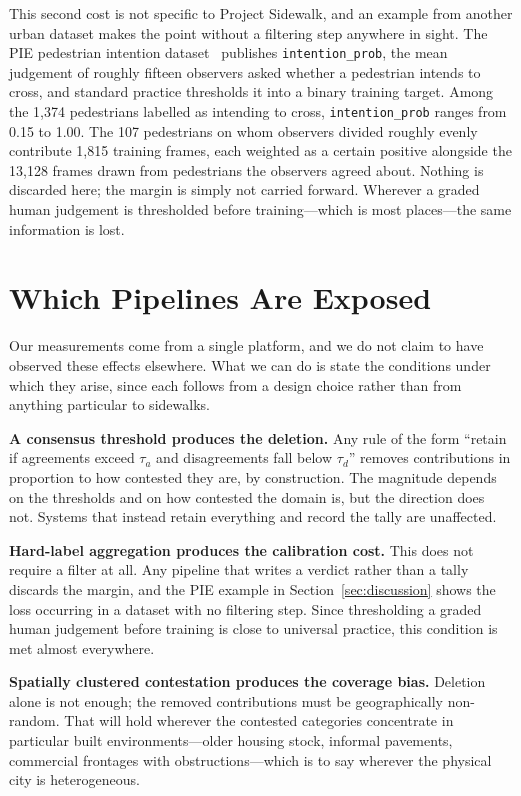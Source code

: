 \documentclass[sigconf]{acmart}
\begin{document}
This second cost is not specific to Project Sidewalk, and an example from
another urban dataset makes the point without a filtering step anywhere in
sight. The PIE pedestrian intention dataset~\cite{rasouli2019pie} publishes
\texttt{intention\_prob}, the mean judgement of roughly fifteen observers asked
whether a pedestrian intends to cross, and standard practice thresholds it into
a binary training target. Among the 1{,}374 pedestrians labelled as intending
to cross, \texttt{intention\_prob} ranges from 0.15 to 1.00. The 107
pedestrians on whom observers divided roughly evenly contribute 1{,}815
training frames, each weighted as a certain positive alongside the 13{,}128
frames drawn from pedestrians the observers agreed about. Nothing is discarded
here; the margin is simply not carried forward. Wherever a graded human
judgement is thresholded before training---which is most places---the same
information is lost.

\section{Which Pipelines Are Exposed}
\label{sec:susceptible}

Our measurements come from a single platform, and we do not claim to have
observed these effects elsewhere. What we can do is state the conditions under
which they arise, since each follows from a design choice rather than from
anything particular to sidewalks.

\textbf{A consensus threshold produces the deletion.} Any rule of the form
``retain if agreements exceed $\tau_a$ and disagreements fall below $\tau_d$''
removes contributions in proportion to how contested they are, by construction.
The magnitude depends on the thresholds and on how contested the domain is, but
the direction does not. Systems that instead retain everything and record the
tally are unaffected.

\textbf{Hard-label aggregation produces the calibration cost.} This does not
require a filter at all. Any pipeline that writes a verdict rather than a tally
discards the margin, and the PIE example in Section~\ref{sec:discussion} shows
the loss occurring in a dataset with no filtering step. Since thresholding a
graded human judgement before training is close to universal practice, this
condition is met almost everywhere.

\textbf{Spatially clustered contestation produces the coverage bias.} Deletion
alone is not enough; the removed contributions must be geographically
non-random. That will hold wherever the contested categories concentrate in
particular built environments---older housing stock, informal pavements,
commercial frontages with obstructions---which is to say wherever the physical
city is heterogeneous.
\end{document}
